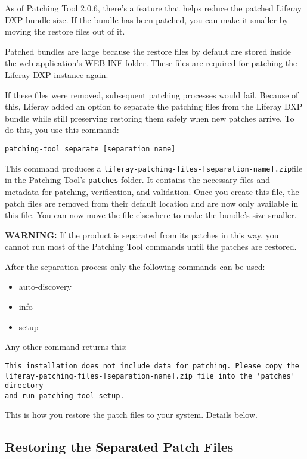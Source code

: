 As of Patching Tool 2.0.6, there's a feature that helps reduce the
patched Liferay DXP bundle size. If the bundle has been patched, you can
make it smaller by moving the restore files out of it.

Patched bundles are large because the restore files by default are
stored inside the web application's WEB-INF folder. These files are
required for patching the Liferay DXP instance again.

If these files were removed, subsequent patching processes would fail.
Because of this, Liferay added an option to separate the patching files
from the Liferay DXP bundle while still preserving restoring them safely
when new patches arrive. To do this, you use this command:

\begin{verbatim}
patching-tool separate [separation_name] 
\end{verbatim}

This command produces a
\texttt{liferay-patching-files-{[}separation-name{]}.zip}file in the
Patching Tool's \texttt{patches} folder. It contains the necessary files
and metadata for patching, verification, and validation. Once you create
this file, the patch files are removed from their default location and
are now only available in this file. You can now move the file elsewhere
to make the bundle's size smaller.

\textbf{WARNING:} If the product is separated from its patches in this
way, you cannot run most of the Patching Tool commands until the patches
are restored.

After the separation process only the following commands can be used:

\begin{itemize}
\tightlist
\item
  auto-discovery
\item
  info
\item
  setup
\end{itemize}

Any other command returns this:

\begin{verbatim}
This installation does not include data for patching. Please copy the
liferay-patching-files-[separation-name].zip file into the 'patches' directory
and run patching-tool setup. 
\end{verbatim}

This is how you restore the patch files to your system. Details below.

\subsection{Restoring the Separated Patch
Files}\label{restoring-the-separated-patch-files}

